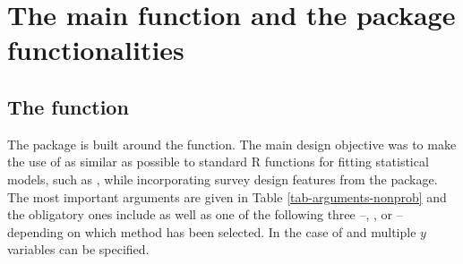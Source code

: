 \documentclass[
]{jss}
\begin{document}
\section{The main function and the package
functionalities}\label{sec-package}

\subsection[The nonprob function]{The  function}

The  package is built around the 
function. The main design objective was to make the use of
 as similar as possible to standard R functions for
fitting statistical models, such as , while
incorporating survey design features from the  package. The
most important arguments are given in Table \ref{tab-arguments-nonprob}
and the obligatory ones include  as well as one of the
following three --, , or  --
depending on which method has been selected. In the case of
 and  multiple \(y\) variables can be
specified.
\end{document}
